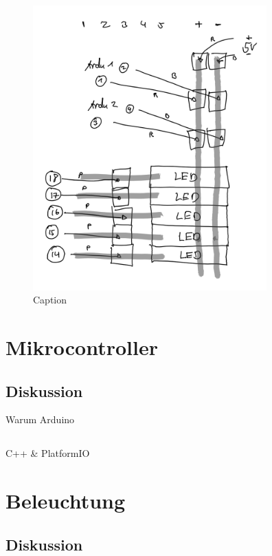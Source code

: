     \begin{figure}[h]
        \begin{center}
            \includegraphics[width=9cm]{media/03_technical_implementation/header_2.png}
        \end{center}
        \caption{Caption}
        \label{fig:header_2}
    \end{figure}




\section{Mikrocontroller}
    \subsection{Diskussion}
        Warum Arduino

    \subsection{}
        C++ \& PlatformIO

\section{Beleuchtung}
    \subsection{Diskussion}

